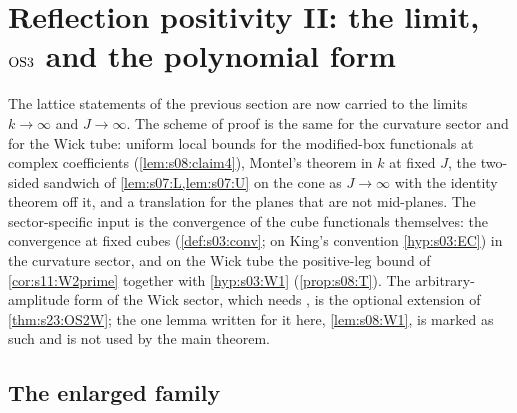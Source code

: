 \section{Reflection positivity II: the limit, \texorpdfstring{$\mathrm{OS3}$}{OS3} and the polynomial form}

The lattice statements of the previous section are now carried to the limits $k\to\infty$ and $J\to\infty$. The scheme of proof is the same for the curvature sector and for the Wick tube: uniform local bounds for the modified-box functionals at complex coefficients (\cref{lem:s08:claim4}), Montel's theorem in $k$ at fixed $J$, the two-sided sandwich of \cref{lem:s07:L,lem:s07:U} on the cone as $J\to\infty$ with the identity theorem off it, and a translation for the planes that are not mid-planes. The sector-specific input is the convergence of the cube functionals themselves: the convergence at fixed cubes (\cref{def:s03:conv}; on King's convention \cref{hyp:s03:EC}) in the curvature sector, and on the Wick tube the positive-leg bound of \cref{cor:s11:W2prime} together with \cref{hyp:s03:W1} (\cref{prop:s08:T}). The arbitrary-amplitude form of the Wick sector, which needs \Wtwo, is the optional extension of \cref{thm:s23:OS2W}; the one lemma written for it here, \cref{lem:s08:W1}, is marked as such and is not used by the main theorem.

\subsection{The enlarged family}


